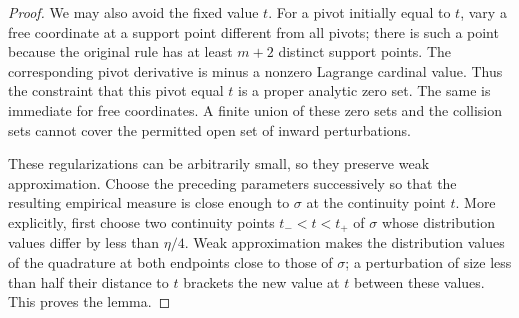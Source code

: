 \documentclass[11pt]{article}
\begin{document}
\begin{proof}
We may also avoid the fixed value $t$. For a pivot initially equal
to $t$, vary a free coordinate at a support point different from all
pivots; there is such a point because the original rule has at least
$m+2$ distinct support points. The corresponding pivot derivative
is minus a nonzero Lagrange cardinal value. Thus the constraint
that this pivot equal $t$ is a proper analytic zero set. The same
is immediate for free coordinates. A finite union of these zero
sets and the collision sets cannot cover the permitted open set
of inward perturbations.

These regularizations can be arbitrarily small, so they preserve
weak approximation. Choose the preceding parameters successively
so that the resulting empirical measure is close enough to $\sigma$
at the continuity point $t$. More explicitly, first choose two
continuity points $t_-<t<t_+$ of $\sigma$ whose distribution values
differ by less than $\eta/4$. Weak approximation makes the
distribution values of the quadrature at both endpoints close to
those of $\sigma$; a perturbation of size less than half their
distance to $t$ brackets the new value at $t$ between these values.
This proves the lemma.
\end{proof}
\end{document}
